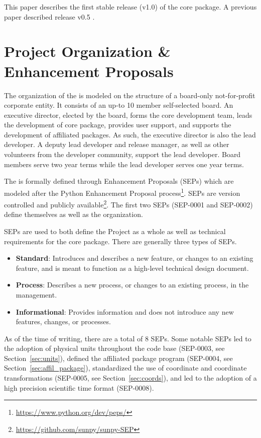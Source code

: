 This paper describes the first stable release (v1.0) of the core package.
A previous paper described release v0.5 \citep{Community:2015cy}.

\section{Project Organization \& Enhancement Proposals}

The organization of the \sunpyproj is modeled on the structure of a board-only not-for-profit corporate entity.
It consists of an up-to 10 member self-selected board.
An executive director, elected by the board, forms the core development team, leads the development of \sunpy core package, provides user support, and supports the development of affiliated packages.
As such, the executive director is also the \sunpy lead developer.
A deputy lead developer and release manager, as well as other volunteers from the developer community, support the lead developer.
Board members serve two year terms while the lead developer serves one year terms.

The \sunpyproj is formally defined through \sunpy Enhancement Proposals (SEPs) which are modeled after the Python Enhancement Proposal process\footnote{\url{https://www.python.org/dev/peps/}}.
SEPs are version controlled and publicly available\footnote{\url{https://github.com/sunpy/sunpy-SEP}}.
The first two SEPs (SEP-0001 and SEP-0002) define themselves as well as the \sunpy organization.

SEPs are used to both define the Project as a whole as well as technical requirements for the \sunpypkg core package.
There are generally three types of SEPs.
\begin{itemize}
    \item \textbf{Standard}: Introduces and describes a new feature, or changes to an existing feature, and is meant to function as a high-level technical design document.
    \item \textbf{Process}: Describes a new process, or changes to an existing process, in the \sunpyproj management.
    \item \textbf{Informational}: Provides information and does not introduce any new features, changes, or processes.
\end{itemize}

As of the time of writing, there are a total of 8 SEPs.
Some notable SEPs led to the adoption of physical units throughout the code base (SEP-0003, see Section~\ref{sec:units}), defined the affiliated package program (SEP-0004, see Section~\ref{sec:affil_package}), standardized the use of coordinate and coordinate transformations (SEP-0005, see Section~\ref{sec:coords}), and led to the adoption of a high precision scientific time format (SEP-0008).

